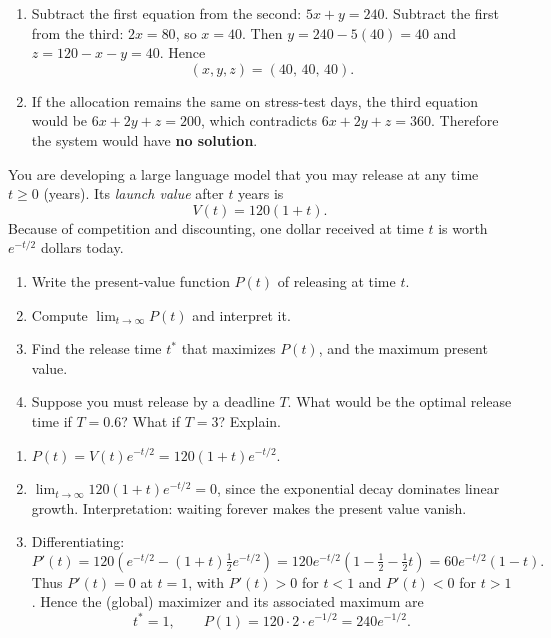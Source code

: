 \documentclass[11pt]{exam}
\begin{document}
\begin{questions}
\begin{solution}[0cm]
\begin{enumerate}[leftmargin=0.5cm,label=(\alph*)]
\item Subtract the first equation from the second: \(5x+y=240\).
Subtract the first from the third: \(2x=80\), so \(x=40\).
Then \(y=240-5(40)=40\) and \(z=120-x-y=40\). Hence
\[
(x,y,z)=(40,\,40,\,40).
\]

\item If the allocation remains the same on stress-test days, the third equation would be
\(6x+2y+z=200\), which contradicts \(6x+2y+z=360\). Therefore the system would have \textbf{no solution}.

\end{enumerate}
\end{solution}

\question[2]
You are developing a large language model that you may release at any time $t\ge 0$ (years).
Its \emph{launch value} after $t$ years is
\[
V(t)=120(1+t).
\]
Because of competition and discounting, one dollar received at time $t$ is worth $e^{-t/2}$ dollars today.

\begin{enumerate}[leftmargin = 0.5cm, label = (\alph*), rightmargin = 0.2cm]
    \item Write the present-value function $P(t)$ of releasing at time $t$.
    \item Compute $\lim_{t\to\infty} P(t)$ and interpret it.
    \item Find the release time $t^*$ that maximizes $P(t)$, and the maximum present value.
    \item Suppose you must release by a deadline $T$. What would be the optimal release time if $T=0.6$? What if $T=3$? Explain.
\end{enumerate}

\begin{solution}[0cm]
\begin{enumerate}[leftmargin = 0.5cm, label = (\alph*), rightmargin = 0.2cm]

\item
$P(t)=V(t)e^{-t/2}=120(1+t)e^{-t/2}$.

\item
$\lim_{t\to\infty} 120(1+t)e^{-t/2}=0$, since the exponential decay dominates linear growth. Interpretation: waiting forever makes the present value vanish.

\item
Differentiating:
\[
P'(t)=120\left(e^{-t/2}-(1+t)\tfrac12 e^{-t/2}\right)
=120e^{-t/2}\left(1-\tfrac12-\tfrac12 t\right)
=60e^{-t/2}(1-t).
\]
Thus $P'(t)=0$ at $t=1$, with $P'(t)>0$ for $t<1$ and $P'(t)<0$ for $t>1$. Hence the (global) maximizer and its associated maximum are
\[
t^*=1,
\qquad
P(1)=120\cdot 2\cdot e^{-1/2}=240e^{-1/2}.
\]


\end{enumerate}
\end{solution}
\end{questions}
\end{document}
